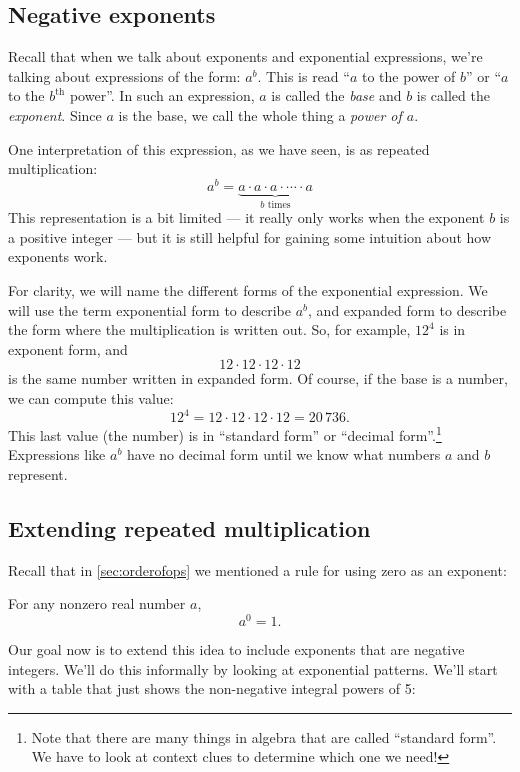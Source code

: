 \subsection{Negative exponents}
\label{sec:exponegative}

Recall that when we talk about exponents and exponential expressions, we're talking about expressions of the form: $a^b$. This is read ``$a$ to the power of $b$'' or ``$a$ to the $b^{\text{th}}$ power''. In such an expression, $a$ is called the \textit{base} and $b$ is called the \textit{exponent}. Since $a$ is the base, we call the whole thing a \textit{power of $a$}.

One interpretation of this expression, as we have seen, is as repeated multiplication:
\[a^b = \underbrace{a \cdot a \cdot a \cdot \dotsm \cdot a}_{\text{$b$ times}}\]
This representation is a bit limited --- it really only works when the exponent $b$ is a positive integer --- but it is still helpful for gaining some intuition about how exponents work.

For clarity, we will name the different forms of the exponential expression. We will use the term \gls{exponential form} to describe $a^b$, and \gls{expanded form} to describe the form where the multiplication is written out. So, for example, $12^4$ is in exponent form, and \[12\cdot12\cdot12\cdot12\] is the same number written in expanded form. Of course, if the base is a number, we can compute this value: \[12^4 = 12\cdot12\cdot12\cdot12 = 20\,736.\] This last value (the number) is in ``standard form'' or ``decimal form''.\footnote{Note that there are many things in algebra that are called ``standard form''. We have to look at context clues to determine which one we need!} Expressions like $a^b$ have no decimal form until we know what numbers $a$ and $b$ represent.

\subsection{Extending repeated multiplication}

Recall that in \cref{sec:orderofops} we mentioned a rule for using zero as an exponent:

\begin{boxdef}
For any nonzero real number $a$, \[a^0 = 1.\]
\end{boxdef}

Our goal now is to extend this idea to include exponents that are negative integers. We'll do this informally by looking at exponential patterns. We'll start with a table that just shows the non-negative integral powers of 5:

